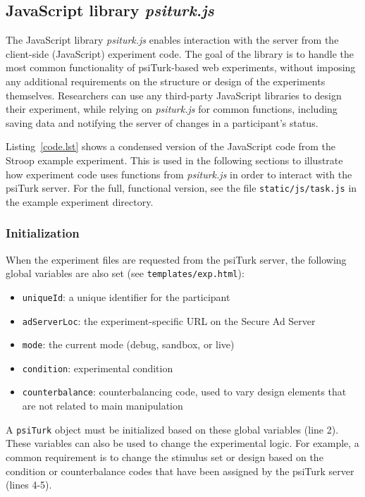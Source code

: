 \documentclass[twocolumn]{svjour3}          %
\newcommand{\psiturk}[0]{\textsf{psiTurk}}
\newcommand{\psiturkjs}[0]{\emph{psiturk.js}}
\begin{document}
\subsection{JavaScript library \psiturkjs{}}

The JavaScript library \psiturkjs{} enables interaction with the server from the client-side (JavaScript) experiment code.
The goal of the library is to handle the most common functionality of \psiturk{}-based web experiments, without imposing any additional requirements on the structure or design of the experiments themselves.
Researchers can use any third-party JavaScript libraries to design their experiment, while relying on \psiturkjs{} for common functions, including saving data and notifying the server of changes in a participant's status.

Listing~\ref{code.lst} shows a condensed version of the JavaScript code from the Stroop example experiment.
This is used in the following sections to illustrate how experiment code uses functions from \psiturkjs{} in order to interact with the \psiturk{} server.
For the full, functional version, see the file \texttt{static/js/task.js} in the example experiment directory.

\subsubsection{Initialization}

When the experiment files are requested from the \psiturk{} server, the following global variables are also set (see \texttt{templates/exp.html}):

\begin{itemize}
\item \texttt{uniqueId}: a unique identifier for the participant
\item \texttt{adServerLoc}: the experiment-specific URL on the Secure Ad Server
\item \texttt{mode}: the current mode (debug, sandbox, or live)
\item \texttt{condition}: experimental condition
\item \texttt{counterbalance}: counterbalancing code, used to vary design elements that are not related to main manipulation 
\end{itemize}

A \texttt{psiTurk} object must be initialized based on these global variables (line 2).
These variables can also be used to change the experimental logic.
For example, a common requirement is to change the stimulus set or design based on the condition or counterbalance codes that have been assigned by the \psiturk{} server (lines 4-5).
\end{document}
